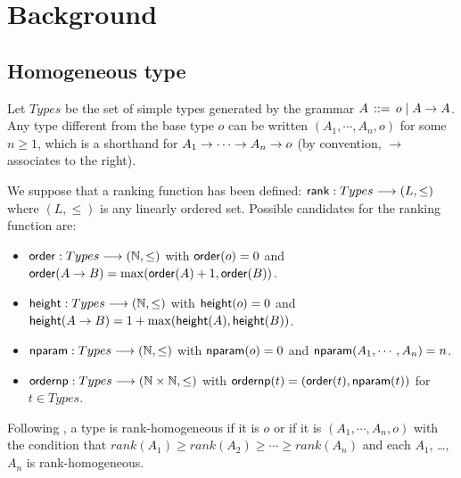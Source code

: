 \section{Background}


\subsection{Homogeneous type}
\label{sec:homotypes}

Let $Types$ be the set of simple types generated by the grammar $A
\, ::= \, o \; | \; A \rightarrow A$. Any type different from the base
type $o$ can be written $(A_1, \cdots, A_n, o)$ for some $n \geq 1$,
which is a shorthand for $A_1 \rightarrow \cdots \rightarrow A_n \rightarrow o$ (by
convention, $\rightarrow$ associates to the right).

We suppose that a ranking function has been defined: ${\sf rank} :
Types \longrightarrow (L, \leq)$ where $(L, \leq)$ is any linearly ordered
set. Possible candidates for the ranking function are:
\begin{itemize}
\item ${\sf order} : Types \longrightarrow (\mathbb{N},\leq)$ with ${\sf order}(o) = 0$
and ${\sf order}(A \rightarrow B) = \max({\sf order}(A)+1, {\sf order}(B))$.
\item ${\sf height} : Types \longrightarrow (\mathbb{N},\leq)$ with ${\sf height}(o) = 0$
and ${\sf height}(A \rightarrow B) = 1 + \max({\sf height}(A), {\sf height}(B))$.
\item ${\sf nparam} : Types \longrightarrow (\mathbb{N},\leq)$ with ${\sf nparam}(o) = 0$
and ${\sf nparam}(A_1, \cdots, A_n) = n$.
\item ${\sf ordernp} : Types \longrightarrow (\mathbb{N} \times \mathbb{N},\leq)$ with $ {\sf ordernp} (t)  = ({\sf order}(t), {\sf nparam}(t))$ for $t \in Types$.
\end{itemize}


Following \cite{KNU02}, a type is rank-homogeneous if it is $o$ or
if it is $(A_1, \cdots, A_n, o)$ with the condition that $rank(A_1)
\geq rank(A_2)\geq \cdots \geq rank(A_n)$ and each $A_1$, \ldots,
$A_n$ is rank-homogeneous.



